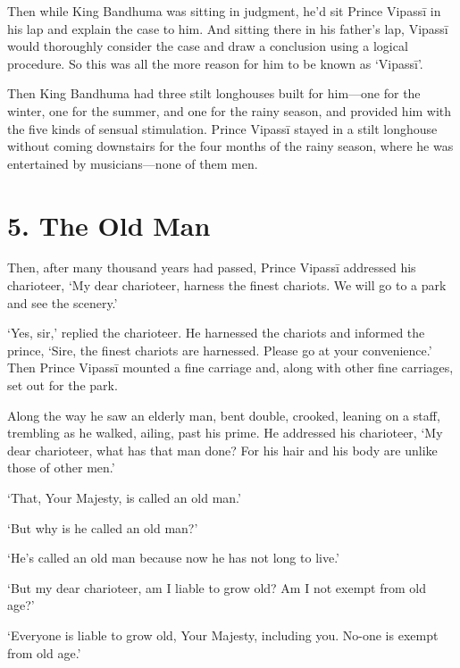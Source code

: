 \documentclass[12pt,openany]{book}%
\begin{document}
Then while King Bandhuma was sitting in judgment, he’d sit Prince \textsanskrit{Vipassī} in his lap and explain the case to him. And sitting there in his father’s lap, \textsanskrit{Vipassī} would thoroughly consider the case and draw a conclusion using a logical procedure. So this was all the more reason for him to be known as ‘\textsanskrit{Vipassī}’. 

Then King Bandhuma had three stilt longhouses built for him—one for the winter, one for the summer, and one for the rainy season, and provided him with the five kinds of sensual stimulation. Prince \textsanskrit{Vipassī} stayed in a stilt longhouse without coming downstairs for the four months of the rainy season, where he was entertained by musicians—none of them men. 

\section*{5. The Old Man }

Then, after many thousand years had passed, Prince \textsanskrit{Vipassī} addressed his charioteer, ‘My dear charioteer, harness the finest chariots. We will go to a park and see the scenery.’ 

‘Yes, sir,’ replied the charioteer. He harnessed the chariots and informed the prince, ‘Sire, the finest chariots are harnessed. Please go at your convenience.’ Then Prince \textsanskrit{Vipassī} mounted a fine carriage and, along with other fine carriages, set out for the park. 

Along the way he saw an elderly man, bent double, crooked, leaning on a staff, trembling as he walked, ailing, past his prime. He addressed his charioteer, ‘My dear charioteer, what has that man done? For his hair and his body are unlike those of other men.’ 

‘That, Your Majesty, is called an old man.’ 

‘But why is he called an old man?’ 

‘He’s called an old man because now he has not long to live.’ 

‘But my dear charioteer, am I liable to grow old? Am I not exempt from old age?’ 

‘Everyone is liable to grow old, Your Majesty, including you. No-one is exempt from old age.’ 
\end{document}
